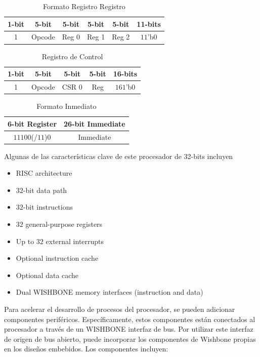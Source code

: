 \documentclass[twocolumn]{IEEEtran}
\begin{document}
\begin{table}[H]
	\centering
\begin{tabular}[c]{|c|c|c|c|c|c|} \hline
\textbf{1-bit} & \textbf{5-bit} & \textbf{5-bit} & \textbf{5-bit} & \textbf{5-bit} & \textbf{11-bits} \\ \hline
1 & Opcode & Reg 0 & Reg 1 & Reg 2 & $1${$1$'b$0$} \\ \hline
\end{tabular}
	\caption{Formato Registro Registro}
	\label{tab2}
\end{table}
\begin{table}[H]
	\centering
\begin{tabular}[c]{|c|c|c|c|c|} \hline
\textbf{1-bit} & \textbf{5-bit} & \textbf{5-bit} & \textbf{5-bit} & \textbf{16-bits} \\ \hline
1 & Opcode & CSR 0 & Reg & $16${$1$'b$0$} \\ \hline
\end{tabular}
	\caption{Registro de Control}
	\label{tab3}
\end{table}
\begin{table}[H]
	\centering
\begin{tabular}[c]{|c|c|} \hline
\textbf{6-bit Register} & \textbf{26-bit Immediate} \\ \hline
$11100$(/$11$)$0$ & Immediate \\ \hline
\end{tabular}
	\caption{Formato Inmediato}
	\label{tab4}
\end{table}
\noindent
Algunas de las características clave de este procesador de 32-bits incluyen
\begin{itemize}
 \item RISC architecture
 \item $32$-bit data path
 \item $32$-bit instructions
 \item $32$ general-purpose registers
 \item Up to $32$ external interrupts
 \item Optional instruction cache
 \item Optional data cache
 \item Dual WISHBONE memory interfaces (instruction and data)
\end{itemize}
\noindent
Para acelerar el desarrollo de procesos del  procesador, se pueden adicionar  componentes periféricos. Específicamente, estos componentes están conectados al procesador a través de un WISHBONE interfaz de bus. Por utilizar este interfaz de origen de bus abierto, puede incorporar los componentes de Wishbone propias en los diseños embebidos. Los componentes incluyen:
\end{document}
